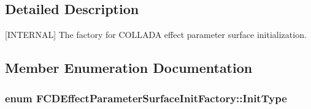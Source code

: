 \subsection{Detailed Description}
\mbox{[}INTERNAL\mbox{]} The factory for COLLADA effect parameter surface initialization. 

\subsection{Member Enumeration Documentation}
\hypertarget{classFCDEffectParameterSurfaceInitFactory_a65e74f1159865702cac5236dd5d83892}{
\subsubsection[{InitType}]{\setlength{\rightskip}{0pt plus 5cm}enum {\bf FCDEffectParameterSurfaceInitFactory::InitType}}}
\label{classFCDEffectParameterSurfaceInitFactory_a65e74f1159865702cac5236dd5d83892}

